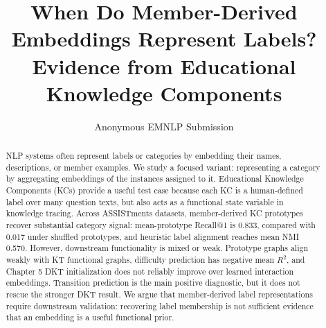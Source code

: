 \documentclass[11pt]{article}
\title{When Do Member-Derived Embeddings Represent Labels? Evidence from Educational Knowledge Components}
\author{Anonymous EMNLP Submission}
\begin{document}
\maketitle
\begin{abstract}
NLP systems often represent labels or categories by embedding their names, descriptions, or member examples. We study a focused variant: representing a category by aggregating embeddings of the instances assigned to it. Educational Knowledge Components (KCs) provide a useful test case because each KC is a human-defined label over many question texts, but also acts as a functional state variable in knowledge tracing. Across ASSISTments datasets, member-derived KC prototypes recover substantial category signal: mean-prototype Recall@1 is 0.833, compared with 0.017 under shuffled prototypes, and heuristic label alignment reaches mean NMI 0.570. However, downstream functionality is mixed or weak. Prototype graphs align weakly with KT functional graphs, difficulty prediction has negative mean $R^2$, and Chapter 5 DKT initialization does not reliably improve over learned interaction embeddings. Transition prediction is the main positive diagnostic, but it does not rescue the stronger DKT result. We argue that member-derived label representations require downstream validation: recovering label membership is not sufficient evidence that an embedding is a useful functional prior.
\end{abstract}












\end{document}
